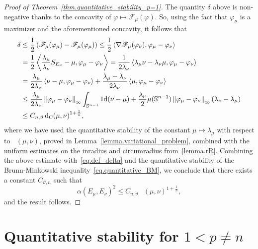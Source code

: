 \documentclass[a4paper, 10pt, twoside]{amsart}
\numberwithin{equation}{section}
\theoremstyle{plain}
\theoremstyle{definition}
\DeclareMathOperator{\dc}{\mathrm{d}_\mathrm{C}}
\begin{document}
\begin{proof}[Proof of Theorem~\ref{thm.quantitative_stability_p=1}]
    The quantity $\delta$ above is non-negative thanks to the concavity of $\varphi \mapsto \mathscr{F}_\mu(\varphi)$. So, using the fact that $\varphi_{\mu}$ is a maximizer and the aforementioned concavity, it follows that
    \begin{align*}
        \delta &\le \frac{1}{2}
        \left(
            \mathscr{F}_\mu(\varphi_\mu) 
            - 
            \mathscr{F}_\mu(\varphi_\mu) 
        \right)
        \le 
        \frac{1}{2}
        \inner{\nabla \mathscr{F}_\mu(\varphi_\nu), \varphi_\mu - \varphi_\nu}\\
        &= 
        \frac{1}{2}
        \inner{
            \frac{\lambda_\mu}{\lambda_\nu}S_{E_\nu} - \mu, \varphi_\mu - \varphi_\nu}
        = 
        \frac{1}{2\lambda_\nu}
        \inner{\lambda_\mu \nu - \lambda_\nu \mu, \varphi_\mu - \varphi_\nu}\\ 
        &= 
        \frac{\lambda_\mu}{2\lambda_\nu} \inner{\nu - \mu, \varphi_\mu - \varphi_\nu}
        + 
        \frac{\lambda_\mu - \lambda_\nu}{2\lambda_\nu} \inner{\mu, \varphi_\mu - \varphi_\nu}
        \\
        &\le 
        \frac{\lambda_\mu}{2\lambda_\nu} \norm{\varphi_\mu - \varphi_\nu}_\infty 
        \int_{\mathbb{S}^{n-1}} 1 \dd (\nu - \mu) 
        + 
        \frac{\lambda_\nu}{2}\mu(\mathbb{S}^{n-1})\norm{\varphi_\mu - \varphi_\nu}_\infty (\lambda_\nu - \lambda_\mu) \\ 
        &\le  
        C_{n,\vartheta}\, {\dc(\mu,\nu)}^{1 + \frac{1}{n}},
    \end{align*}
    where we have used the quantitative stability of the constant $\mu \mapsto \lambda_\mu$ with respect to $\dc(\mu,\nu)$, proved in Lemma~\ref{lemma.variational_problem}, combined with the uniform estimates on the inradius and circumradius from~\ref{lemma.rR}. Combining the above estimate with~\eqref{eq.def_delta} and the quantitative stability of the Brunn-Minkowski inequality~\eqref{eq.quantitative_BM}, we conclude that there exists a constant $C_{\vartheta,n}$ such that 
    \[
        \alpha(E_\mu, E_\nu)^2 \le C_{n,\vartheta}\, {\dc(\mu,\nu)}^{1 + \frac{1}{n}},
    \]
    and the result follows.
\end{proof}

\section{Quantitative stability for $1 < p \neq n$}
\label{secp>1}
\end{document}
